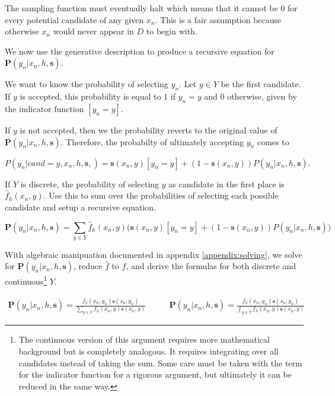 \documentclass[twoside]{article}
\begin{document}
The sampling function must eventually halt which means that it cannot be 0 for every potential candidate of any given \(x_n\). This is a fair assumption because otherwise \(x_n\) would never appear in \(D\) to begin with.

We now use the generative description to produce a recursive equation for \(\mathbf{P}(y_n|x_n,h,\mathbf{s})\).

We want to know the probability of selecting \(y_n\). Let \(y \in Y\) be the first candidate. If \(y\) is accepted, this probability is equal to 1 if \(y_n = y\) and 0 otherwise, given by the indicator function \(\left [y_n = y\right ]\).

If \(y\) is not accepted, then we the probability reverts to the original value of \(\mathbf{P}(y_n|x_n,h,\mathbf{s})\). Therefore, the probabilty of ultimately accepting \(y_n\) comes to

\[P(y_n|cand=y,x_n,h,\mathbf{s},)=\mathbf{s}(x_n,y)\left [y_n = y\right ] + (1-\mathbf{s}(x_n,y))P(y_n|x_n,h,\mathbf{s}).\]

If \(Y\) is discrete, the probability of selecting \(y\) as candidate in the first place is \(\hat{f}_h(x_n, y)\). Use this to sum over the probabilities of selecting each possible candidate and setup a recursive equation.

\begin{equation}
\label{eq:bias_corrected_setup}
\mathbf{P}(y_n|x_n,h,\mathbf{s})=\sum_{y \in Y}\hat{f}_h(x_n,y)\big(\mathbf{s}(x_n,y)\left [y_n = y\right ] + (1-\mathbf{s}(x_n,y))P(y_n|x_n,h,\mathbf{s})\big)
\end{equation}

With algebraic manipuation documented in appendix \ref{appendix:solving}, we solve for \(\mathbf{P}(y_n|x_n,h,\mathbf{s})\), reduce \(\hat{f}\) to \(f\), and derive the formulas for both discrete and continuous\footnote{The continuous version of this argument requires more mathematical background but is completely analogous. It requires integrating over all candidates instead of taking the sum. Some care must be taken with the term for the indicator function for a rigorous argument, but ultimately it can be reduced in the same way.} \(Y\).

\begin{align}
\label{eq:bias_corrected_prob}
\mathbf{P}(y_n|x_n,h,\mathbf{s})=\frac{f_h(x_n,y_n)\mathbf{s}(s_n,y_n)}{\sum_{y \in Y}f_h(x_n,y)\mathbf{s}(x_n,y)} &
\qquad\mathbf{P}(y_n|x_n,h,\mathbf{s})=\frac{f_h(x_n,y_n)\mathbf{s}(s_n,y_n)}{\int_{y \in Y}f_h(x_n,y)\mathbf{s}(x_n,y)}
\end{align}
\end{document}

